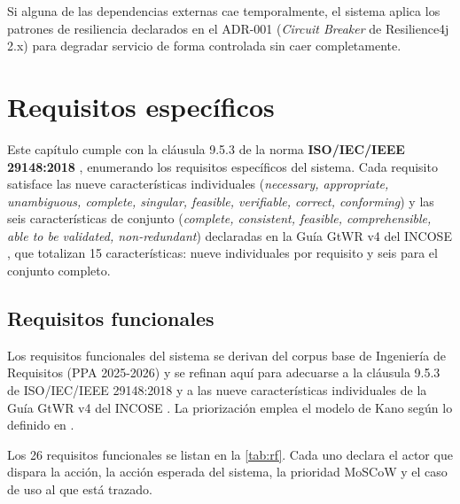 \documentclass[11pt,a4paper,twoside]{report}
\begin{document}
Si alguna de las dependencias externas cae temporalmente, el sistema aplica los patrones de resiliencia declarados en el ADR-001 (\emph{Circuit Breaker} de Resilience4j 2.x) para degradar servicio de forma controlada sin caer completamente.

\chapter{Requisitos espec\'ificos}
\label{cap:requisitos_especificos}

\begin{cajaNota}[title=Prop\'osito de este cap\'itulo]
    Este cap\'itulo cumple con la cl\'ausula 9.5.3 de la norma \textbf{ISO/IEC/IEEE 29148:2018} \cite{iso29148}, enumerando los requisitos espec\'ificos del sistema. Cada requisito satisface las nueve caracter\'isticas individuales (\emph{necessary, appropriate, unambiguous, complete, singular, feasible, verifiable, correct, conforming}) y las seis caracter\'isticas de conjunto (\emph{complete, consistent, feasible, comprehensible, able to be validated, non-redundant}) declaradas en la Gu\'ia GtWR v4 del INCOSE \cite{incose2023requirements}, que totalizan 15 caracter\'isticas: nueve individuales por requisito y seis para el conjunto completo.
\end{cajaNota}

\section{Requisitos funcionales}
\label{sec:rf}

Los requisitos funcionales del sistema se derivan del corpus base de Ingenier\'ia de Requisitos (PPA 2025-2026) y se refinan aqu\'i para adecuarse a la cl\'ausula 9.5.3 de ISO/IEC/IEEE 29148:2018 \cite{iso29148} y a las nueve caracter\'isticas individuales de la Gu\'ia GtWR v4 del INCOSE \cite{incose2023requirements}. La priorizaci\'on emplea el modelo de Kano seg\'un lo definido en \cite{pohl2010requirements}.

Los 26 requisitos funcionales se listan en la \cref{tab:rf}. Cada uno declara el actor que dispara la acci\'on, la acci\'on esperada del sistema, la prioridad MoSCoW y el caso de uso al que est\'a trazado.
\end{document}
